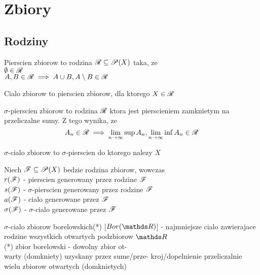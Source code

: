 \section{Zbiory}
\subsection{Rodziny}
\begin{multicols}{2}
    
    {\color{def}Pierscien zbiorow} to rodzina $\mathcal{R}\subseteq \mathcal{P}(X)$ taka, ze\smallskip\\
    \point $\emptyset\in \mathcal{R}$\smallskip\\
    \point $A, B\in\mathcal{R}\implies A\cup B,A\setminus B\in \mathcal{R}$\smallskip
    
    {\color{def}Cialo zbiorow} to pierscien zbiorow, dla ktorego $X\in\mathcal{R}$\smallskip

    {\color{def}$\sigma$-pierscien zbiorow} to rodzina $\mathcal{R}$ ktora jest pierscieniem zamknietym na przeliczalne sumy. Z tego wynika, ze
    $$A_n\in\mathcal{R}\implies \lim\limits_{n\to\infty}\sup A_n,\lim\limits_{n\to\infty}\inf A_n\in\mathcal{R}$$
    
    {\color{def}$\sigma$-cialo zbiorow} to $\sigma$-pierscien do ktorego nalezy $X$\medskip

    \medskip

    Niech $\mathcal{F}\subseteq \mathcal{P}(X)$ bedzie rodzina zbiorow, wowczas\smallskip\\
    {\color{acc}\point $r(\mathcal{F})$} - pierscien generowany przez rodzine $\mathcal{F}$\smallskip\\
    {\color{acc}\point $s(\mathcal{F})$} - $\sigma$-pierscien generowany przez rodzine $\mathcal{F}$\smallskip\\
    {\color{acc}\point $a(\mathcal{F})$} - cialo generowane przez $\mathcal{F}$\smallskip\\
    {\color{acc}\point $\sigma(\mathcal{F})$} - $\sigma$-cialo generowane przez $\mathcal{F}$\medskip

    {\color{def}$\sigma$-cialo zbiorow borelowskich(*)} [$Bor(\R)$] - najmniejsze cialo zawierajace rodzine wszystkich otwartych podzbiorow $\R$\smallskip\\
    \indent (*) {\color{acc}zbior borelowski} - dowolny zbior ot-\\
    \indent warty (domkniety) uzyskany przez sume/prze-
    \indent kroj/dopelnienie przeliczalnie wielu 
    \indent zbiorow otwartych (domknietych)

\end{multicols}\bigskip

